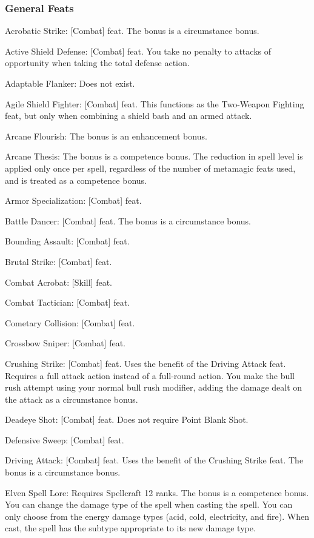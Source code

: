 \subsubsection{General Feats}
\begin{itemize*}
\item Acrobatic Strike: [Combat] feat. The bonus is a circumstance bonus.
\item Active Shield Defense: [Combat] feat. You take no penalty to attacks of opportunity when taking the total defense action.
\item Adaptable Flanker: Does not exist.
\item Agile Shield Fighter: [Combat] feat. This functions as the Two-Weapon Fighting feat, but only when combining a shield bash and an armed attack.
\item Arcane Flourish: The bonus is an enhancement bonus.
\item Arcane Thesis: The bonus is a competence bonus. The reduction in spell level is applied only once per spell, regardless of the number of metamagic feats used, and is treated as a competence bonus.
\item Armor Specialization: [Combat] feat.
\item Battle Dancer: [Combat] feat. The bonus is a circumstance bonus.
\item Bounding Assault: [Combat] feat.
\item Brutal Strike: [Combat] feat.
\item Combat Acrobat: [Skill] feat.
\item Combat Tactician: [Combat] feat.
\item Cometary Collision: [Combat] feat.
\item Crossbow Sniper: [Combat] feat.
\item Crushing Strike: [Combat] feat. Uses the benefit of the Driving Attack feat. Requires a full attack action instead of a full-round action. You make the bull rush attempt using your normal bull rush modifier, adding the damage dealt on the attack as a circumstance bonus.
\item Deadeye Shot: [Combat] feat. Does not require Point Blank Shot.
\item Defensive Sweep: [Combat] feat.
\item Driving Attack: [Combat] feat. Uses the benefit of the Crushing Strike feat. The bonus is a circumstance bonus.
\item Elven Spell Lore: Requires Spellcraft 12 ranks. The bonus is a competence bonus. You can change the damage type of the spell when casting the spell. You can only choose from the energy damage types (acid, cold, electricity, and fire). When cast, the spell has the subtype appropriate to its new damage type.

\end{itemize*}

